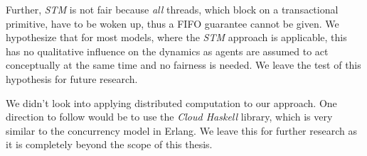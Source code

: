 Further, \textit{STM} is not fair because \textit{all} threads, which block on a transactional primitive, have to be woken up, thus a FIFO guarantee cannot be given. We hypothesize that for most models, where the \textit{STM} approach is applicable, this has no qualitative influence on the dynamics as agents are assumed to act conceptually at the same time and no fairness is needed. We leave the test of this hypothesis for future research.

We didn't look into applying distributed computation to our approach. One direction to follow would be to use the \textit{Cloud Haskell} library, which is very similar to the concurrency model in Erlang. We leave this for further research as it is completely beyond the scope of this thesis. 

